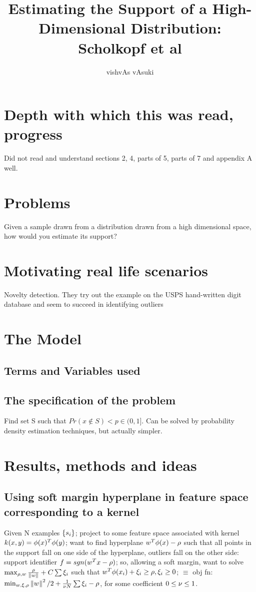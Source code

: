 \documentclass[10pt]{amsart}
\title{Estimating the Support of a High-Dimensional Distribution: Scholkopf et al}
\author{vishvAs vAsuki}
\begin{document}
\maketitle


\section{Depth with which this was read, progress}
Did not read and understand sections 2, 4, parts of 5, parts of 7 and appendix A well.

\section{Problems}
Given a sample drawn from a distribution drawn from a high dimensional space, how would you estimate its support?

\section{Motivating real life scenarios}
Novelty detection. They try out the example on the USPS hand-written digit database and seem to succeed in identifying outliers

\section{The Model}
\subsection{Terms and Variables used}

\subsection{The specification of the problem}
Find set S such that $Pr(x \notin S)<p \in (0,1]$. Can be solved by probability density estimation techniques, but actually simpler.

\section{Results, methods and ideas}
\subsection{Using soft margin hyperplane in feature space corresponding to a kernel}

Given N examples $\set{s_{i}}$; project to some feature space associated with kernel $k(x,y) = \gf(x)^{T}\gf(y)$; want to find hyperplane $w^{T}\gf(x) - \gr$ such that all points in the support fall on one side of the hyperplane, outliers fall on the other side: support identifier $f = sgn(w^{T}x - \gr)$; so, allowing a soft margin, want to solve $\max_{\gr, w} \frac{\gr}{\norm{w}} + C\sum \gx_{i}$ such that $w^{T}\gf(x_{i}) + \gx_{i} \geq \gr, \gx_{i} \geq 0$; $\equiv$ obj fn: $\min_{w, \gx, \gr} \norm{w}^{2}/2 + \frac{1}{\gn N} \sum \gx_{i} - \gr$, for some coefficient $0 \leq \gn \leq 1$.
\end{document}
